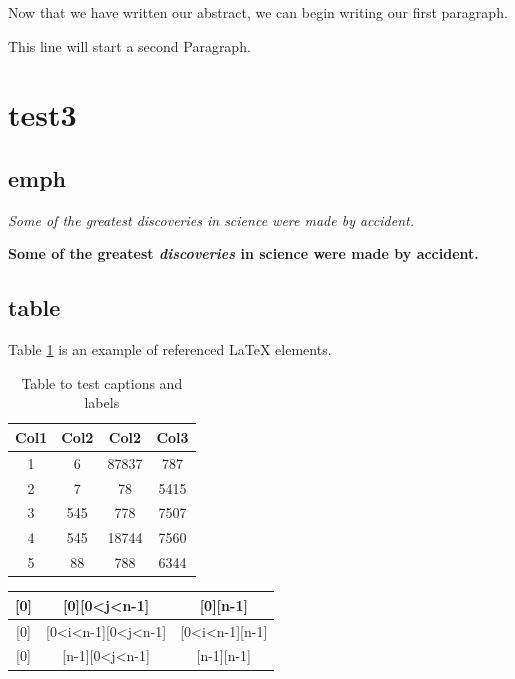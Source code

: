 \documentclass[12pt, letterpaper]{article}
\begin{document}
Now that we have written our abstract, we can begin writing our first paragraph.
 
This line will start a second Paragraph.

\section{test3}
\subsection{emph}
\textit{Some of the greatest \emph{discoveries} 
in science 
were made by accident.}

\textbf{Some of the greatest \emph{discoveries} 
in science 
were made by accident.}


\subsection{table} 
Table \ref{table:data} is an example of referenced \LaTeX{} elements.
\begin{center}
    

\begin{table}[h!]
\centering
\begin{tabular}{||c c c c||} 
 \hline
 Col1 & Col2 & Col2 & Col3 \\ [0.5ex] 
 \hline\hline
 1 & 6 & 87837 & 787 \\ 
 2 & 7 & 78 & 5415 \\
 3 & 545 & 778 & 7507 \\
 4 & 545 & 18744 & 7560 \\
 5 & 88 & 788 & 6344 \\ [1ex] 
 \hline
\end{tabular}
\caption{Table to test captions and labels}
\label{table:data}
\end{table}

\end{center}

\begin{center}
    \begin{tabular}{|c |c| c|}
        \hline
        [0][0] & [0][0<j<n-1] & [0][n-1]\\
        \hline
        [0<i<n-1][0] & [0<i<n-1][0<j<n-1] & [0<i<n-1][n-1]\\
        \hline
        [n-1][0] & [n-1][0<j<n-1] & [n-1][n-1]\\ 
        \hline
    \end{tabular}
\end{center}
\end{document}
